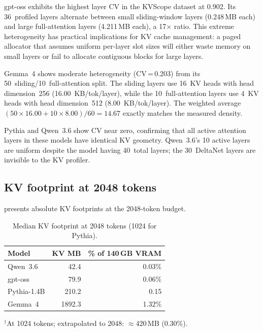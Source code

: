 \documentclass[11pt,a4paper]{article}
\begin{document}
gpt-oss exhibits the highest layer CV in the KVScope dataset
at 0.902.
Its 36~profiled layers alternate between small sliding-window
layers (0.248\,MB each) and large full-attention layers
(4.211\,MB each), a 17$\times$ ratio.
This extreme heterogeneity has practical implications for KV
cache management: a paged allocator that assumes uniform per-layer
slot sizes will either waste memory on small layers or fail to
allocate contiguous blocks for large layers.

Gemma~4 shows moderate heterogeneity (CV\,=\,0.203) from its
50~sliding/10~full-attention split.
The sliding layers use 16~KV heads with head dimension~256
(16.00~KB/tok/layer), while the 10~full-attention layers use
4~KV heads with head dimension~512 (8.00~KB/tok/layer).
The weighted average $(50 \times 16.00 + 10 \times 8.00)/60 = 14.67$
exactly matches the measured density.

Pythia and Qwen~3.6 show CV near zero, confirming that all active
attention layers in these models have identical KV geometry.
Qwen~3.6's 10 active layers are uniform despite the model having
40~total layers; the 30~DeltaNet layers are invisible to the KV
profiler.

\subsection{KV footprint at 2048 tokens}
\label{sec:results:footprint}

 presents absolute KV footprints at the
2048-token budget.

\begin{table}[t]
  \centering
  \small
  \caption{Median KV footprint at 2048 tokens (1024 for Pythia).}
  \label{tab:footprint}
  \begin{tabular}{@{}lrr@{}}
    \toprule
    \textbf{Model} & \textbf{KV MB} & \textbf{\% of 140\,GB VRAM} \\
    \midrule
    Qwen~3.6     & 42.4   & 0.03\% \\
    gpt-oss      & 79.9   & 0.06\% \\
    Pythia-1.4B  & 210.2  & 0.15\rlap{$^\dagger$} \\
    Gemma~4      & 1892.3 & 1.32\% \\
    \bottomrule
  \end{tabular}
  \vspace{2pt}
  {\footnotesize $^\dagger$At 1024 tokens; extrapolated to
  2048: $\approx$420\,MB (0.30\%).}
\end{table}
\end{document}
